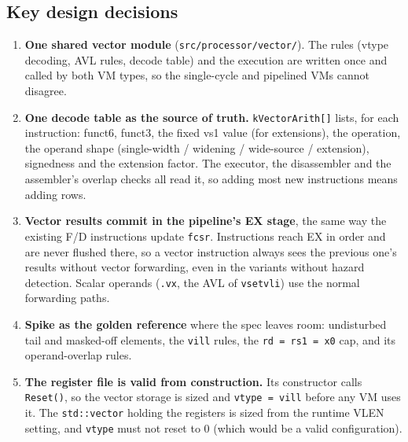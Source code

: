 \documentclass{article}
\begin{document}
\subsection{Key design decisions}
\begin{enumerate}
    \item \textbf{One shared vector module} (\texttt{src/processor/vector/}). The rules (vtype
    decoding, AVL rules, decode table) and the execution are written once and called by both VM
    types, so the single-cycle and pipelined VMs cannot disagree.
    \item \textbf{One decode table as the source of truth.} \texttt{kVectorArith[]} lists, for
    each instruction: funct6, funct3, the fixed vs1 value (for extensions), the operation, the
    operand shape (single-width / widening / wide-source / extension), signedness and the
    extension factor. The executor, the disassembler and the assembler's overlap checks all read
    it, so adding most new instructions means adding rows.
    \item \textbf{Vector results commit in the pipeline's EX stage}, the same way the existing
    F/D instructions update \texttt{fcsr}. Instructions reach EX in order and are never flushed
    there, so a vector instruction always sees the previous one's results without vector
    forwarding, even in the variants without hazard detection. Scalar operands (\texttt{.vx}, the
    AVL of \texttt{vsetvli}) use the normal forwarding paths.
    \item \textbf{Spike as the golden reference} where the spec leaves room: undisturbed tail and
    masked-off elements, the \texttt{vill} rules, the \texttt{rd = rs1 = x0} cap, and its
    operand-overlap rules.
    \item \textbf{The register file is valid from construction.} Its constructor calls
    \texttt{Reset()}, so the vector storage is sized and \texttt{vtype = vill} before any VM uses
    it. The \texttt{std::vector} holding the registers is sized from the runtime VLEN setting, and
    \texttt{vtype} must not reset to 0 (which would be a valid configuration).
\end{enumerate}
\end{document}
